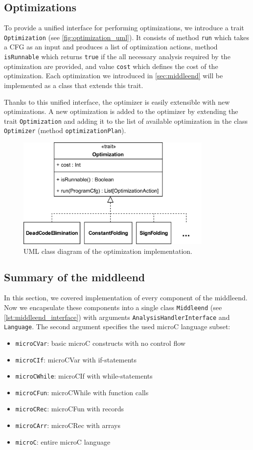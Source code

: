 \documentclass[thesis=M,english]{FITthesis}[2019/12/23]
\begin{document}
\subsection{Optimizations}
To provide a unified interface for performing optimizations, we introduce a trait \texttt{Optimization} (see \autoref{fig:optimization_uml}). It consists of method \texttt{run} which takes a CFG as an input and produces a list of optimization actions, method \texttt{isRunnable} which returns \texttt{true} if the all necessary analysis required by the optimization are provided, and value \texttt{cost} which defines the cost of the optimization. Each optimization we introduced in \autoref{sec:middleend} will be implemented as a class that extends this trait.

Thanks to this unified interface, the optimizer is easily extensible with new optimizations. A new optimization is added to the optimizer by extending the trait \texttt{Optimization} and adding it to the list of available optimization in the class \texttt{Optimizer} (method \texttt{optimizationPlan}).

\begin{figure}
    \centering
    \includegraphics[height=5.5cm]{img/optimization_uml.png}
    \caption{UML class diagram of the optimization implementation.}\label{fig:optimization_uml}
\end{figure}


\subsection{Summary of the middleend}
In this section, we covered implementation of every component of the middleend. Now we encapsulate these components into a single class \texttt{Middleend} (see \autoref{lst:middleend_interface}) with arguments \texttt{AnalysisHandlerInterface} and \texttt{Language}. The second argument specifies the used microC language subset:
\begin{itemize}
    \item \texttt{microCVar}: basic microC constructs with no control flow
    \item \texttt{microCIf}: microCVar with if-statements
    \item \texttt{microCWhile}: microCIf with while-statements
    \item \texttt{microCFun}: microCWhile with function calls
    \item \texttt{microCRec}: microCFun with records
    \item \texttt{microCArr}: microCRec with arrays
    \item \texttt{microC}: entire microC language
\end{itemize}
\end{document}
